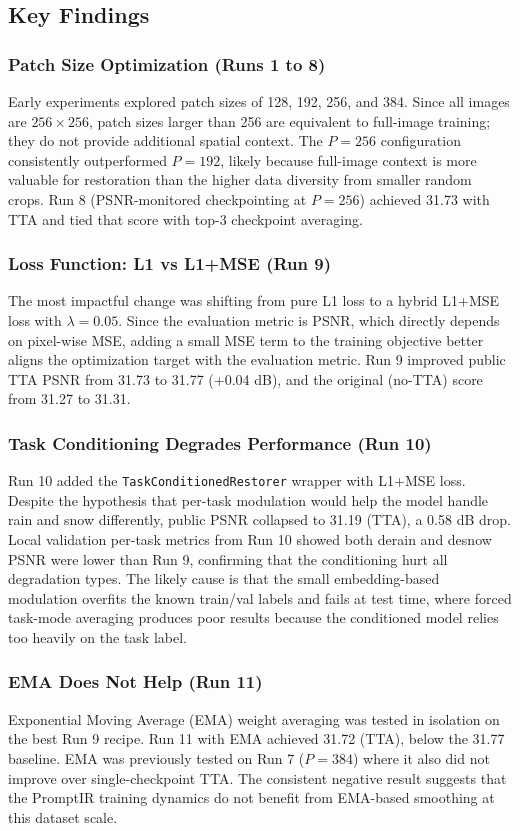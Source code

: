 \documentclass[12pt, a4paper]{article}
\begin{document}
\subsection{Key Findings}

\subsubsection{Patch Size Optimization (Runs 1 to 8)}
Early experiments explored patch sizes of 128, 192, 256, and 384. Since all images are $256 \times 256$, patch sizes larger than 256 are equivalent to full-image training; they do not provide additional spatial context. The $P=256$ configuration consistently outperformed $P=192$, likely because full-image context is more valuable for restoration than the higher data diversity from smaller random crops. Run 8 (PSNR-monitored checkpointing at $P=256$) achieved 31.73 with TTA and tied that score with top-3 checkpoint averaging.

\subsubsection{Loss Function: L1 vs L1+MSE (Run 9)}
The most impactful change was shifting from pure L1 loss to a hybrid L1+MSE loss with $\lambda=0.05$. Since the evaluation metric is PSNR, which directly depends on pixel-wise MSE, adding a small MSE term to the training objective better aligns the optimization target with the evaluation metric. Run 9 improved public TTA PSNR from 31.73 to 31.77 (+0.04 dB), and the original (no-TTA) score from 31.27 to 31.31.

\subsubsection{Task Conditioning Degrades Performance (Run 10)}
Run 10 added the \texttt{TaskConditionedRestorer} wrapper with L1+MSE loss. Despite the hypothesis that per-task modulation would help the model handle rain and snow differently, public PSNR collapsed to 31.19 (TTA), a 0.58 dB drop. Local validation per-task metrics from Run 10 showed both derain and desnow PSNR were lower than Run 9, confirming that the conditioning hurt all degradation types. The likely cause is that the small embedding-based modulation overfits the known train/val labels and fails at test time, where forced task-mode averaging produces poor results because the conditioned model relies too heavily on the task label.

\subsubsection{EMA Does Not Help (Run 11)}
Exponential Moving Average (EMA) weight averaging was tested in isolation on the best Run 9 recipe. Run 11 with EMA achieved 31.72 (TTA), below the 31.77 baseline. EMA was previously tested on Run 7 ($P=384$) where it also did not improve over single-checkpoint TTA. The consistent negative result suggests that the PromptIR training dynamics do not benefit from EMA-based smoothing at this dataset scale.
\end{document}
